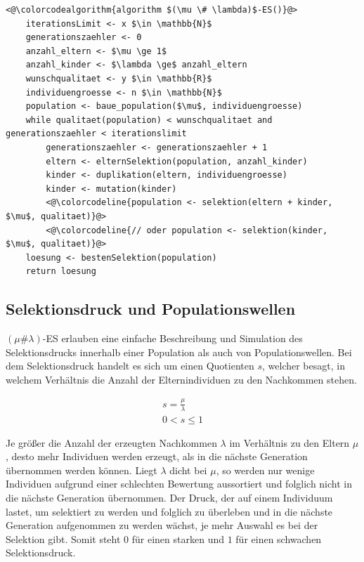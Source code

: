 \begin{lstlisting}[caption={$(\mu \# \lambda)$-Evolutionsstrategie}, firstnumber=1, captionpos=b, label=lst:mu_hash_lambda_es]
<@\colorcodealgorithm{algorithm $(\mu \# \lambda)$-ES()}@>
	iterationsLimit <- x $\in \mathbb{N}$
	generationszaehler <- 0
	anzahl_eltern <- $\mu \ge 1$
	anzahl_kinder <- $\lambda \ge$ anzahl_eltern
	wunschqualitaet <- y $\in \mathbb{R}$
	individuengroesse <- n $\in \mathbb{N}$
	population <- baue_population($\mu$, individuengroesse)
	while qualitaet(population) < wunschqualitaet and generationszaehler < iterationslimit
		generationszaehler <- generationszaehler + 1
		eltern <- elternSelektion(population, anzahl_kinder)
		kinder <- duplikation(eltern, individuengroesse)
		kinder <- mutation(kinder)
		<@\colorcodeline{population <- selektion(eltern + kinder, $\mu$, qualitaet)}@>
		<@\colorcodeline{// oder population <- selektion(kinder, $\mu$, qualitaet)}@>
	loesung <- bestenSelektion(population)
	return loesung
\end{lstlisting}

\subsection{Selektionsdruck und Populationswellen}

$(\mu \# \lambda)$-ES erlauben eine einfache Beschreibung und Simulation des Selektionsdrucks innerhalb einer Population als auch von Populationswellen.
Bei dem Selektionsdruck handelt es sich um einen Quotienten $s$, welcher besagt, in welchem Verhältnis die Anzahl der Elternindividuen zu den Nachkommen stehen.

\begin{equation}
\begin{aligned}
s = \frac{\mu}{\lambda} \\
0 < s \le 1
\end{aligned}
\end{equation}

Je größer die Anzahl der erzeugten Nachkommen $\lambda$ im Verhältnis zu den Eltern $\mu$, desto mehr Individuen werden erzeugt, als in die nächste Generation übernommen werden können.
Liegt $\lambda$ dicht bei $\mu$, so werden nur wenige Individuen aufgrund einer schlechten Bewertung aussortiert und folglich nicht in die nächste Generation übernommen.
Der Druck, der auf einem Individuum lastet, um selektiert zu werden und folglich zu überleben und in die nächste Generation aufgenommen zu werden wächst, je mehr Auswahl es bei der Selektion gibt.
Somit steht $0$ für einen starken und $1$ für einen schwachen Selektionsdruck.

